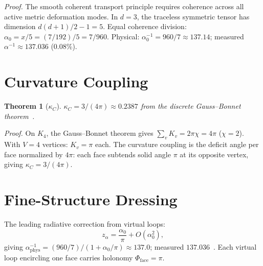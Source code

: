 \documentclass[11pt,twocolumn]{article}
\newtheorem{theorem}{Theorem}
\begin{document}
\textit{Proof.}
The smooth coherent transport principle requires coherence across all active metric deformation modes.
In $d=3$, the traceless symmetric tensor has dimension $d(d+1)/2-1=5$.
Equal coherence division: $\alpha_0=x/5=(7/192)/5=7/960$.
Physical: $\alpha_0^{-1}=960/7\approx 137.14$; measured $\alpha^{-1}\approx 137.036$ (0.08\%).

\section{Curvature Coupling}
\label{sec:kappaC}

\begin{theorem}[$\kappa_C$]
\label{thm:kappaC}
$\kappa_C=3/(4\pi)\approx 0.2387$ from the discrete Gauss--Bonnet theorem~\cite{hirani2003}.
\end{theorem}

\textit{Proof.}
On $K_4$, the Gauss--Bonnet theorem gives $\sum_v K_v=2\pi\chi=4\pi$ ($\chi=2$).
With $V=4$ vertices: $K_v=\pi$ each.
The curvature coupling is the deficit angle per face normalized by $4\pi$: each face subtends solid angle $\pi$ at its opposite vertex, giving $\kappa_C=3/(4\pi)$.

\section{Fine-Structure Dressing}
\label{sec:dressing}

The leading radiative correction from virtual loops:
\begin{equation}
z_\alpha = \frac{\alpha_0}{\pi}+O(\alpha_0^2),
\label{eq:zalpha}
\end{equation}
giving $\alpha_{\mathrm{phys}}^{-1}=(960/7)/(1+\alpha_0/\pi)\approx 137.0$; measured $137.036$~\cite{planck2018}.
Each virtual loop encircling one face carries holonomy $\Phi_{\mathrm{face}}=\pi$.
\end{document}

